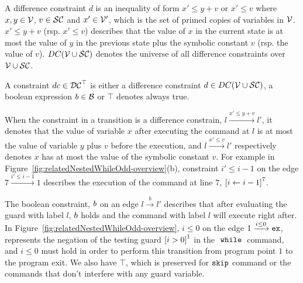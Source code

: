 \begin{defn}
A difference constraint $d$ is an inequality of
form $x' \leq y + v$ or $x' \leq v$ where $x, y \in \mathcal{V} $, $v \in \mathcal{SC}$ and $x' \in \mathcal{V}'$, which is the set of primed copies of variables in $\mathcal{V}$.
$x' \leq y + v$ (rsp. $x' \leq v$) describes that the value of $x$ in the current state is
at most the value of $y$ in the previous state plus the symbolic constant $v$ (rsp. the value of $v$).
$DC(\mathcal{V} \cup \mathcal{SC})$ denotes the universe of all difference constraints over $\mathcal{V} \cup \mathcal{SC}$.
\end{defn}

\begin{defn}[Constraints]
A constraint $dc \in \mathcal{DC}^{\top}$
is either a
difference constraint $d \in DC(\mathcal{V} \cup \mathcal{SC})$, a boolean expression $b \in \mathcal{B}$
or $\top$ denotes always true.
\end{defn}

When the constraint in a transition is a difference constrain, $l \xrightarrow{x' \leq y + v} l'$,
it denotes that
the value of variable $x$
after executing the command at $l$ is at most
the value of variable $y$ plus $v$ before the execution,
and $l \xrightarrow{x' \leq v} l'$ respectively denotes
$x$ has at most
the value of the symbolic constant $v$.
For example in Figure~\ref{fig:relatedNestedWhileOdd-overview}(b), constraint $i' \leq i - 1$ on the edge $7 \xrightarrow{i' \leq i - 1} 1$
describes the execution of
 the command at line $7$, 
$\clabel{\assign{i}{i - 1}}^{7}$. 


The boolean constraint, $b$ on an edge $l \xrightarrow{b} l'$ describes
that after evaluating the guard with label $l$,
$b$ holds and the command with label $l$ will execute right after.
In Figure~\ref{fig:relatedNestedWhileOdd-overview}, $i \leq 0 $ on the edge $1 \xrightarrow{i \leq 0} \mathtt{ex}$, 
represents the negation of the testing guard $\clabel{i > 0}^1$
in the $\;\mathtt{while}\;$ command, and $i \leq 0$ must hold in order to perform this transition from program point $1$ to
the program exit. 
We also have $\top$, which is preserved for $\mathtt{skip}$ command or the commands that don't interfere with any guard variable.


